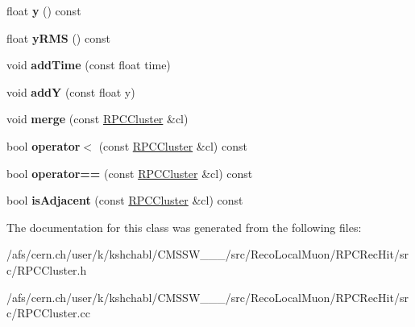 \begin{DoxyCompactItemize}
\item 
\hypertarget{classRPCCluster_a66a7329f93501a605b324adc4971eddd}{float {\bfseries y} () const }\label{classRPCCluster_a66a7329f93501a605b324adc4971eddd}

\item 
\hypertarget{classRPCCluster_aa9cccbb7e3df2edd52bcbae3e6081285}{float {\bfseries y\-R\-M\-S} () const }\label{classRPCCluster_aa9cccbb7e3df2edd52bcbae3e6081285}

\item 
\hypertarget{classRPCCluster_af8a099e1f086a5337d53025dc0677dcf}{void {\bfseries add\-Time} (const float time)}\label{classRPCCluster_af8a099e1f086a5337d53025dc0677dcf}

\item 
\hypertarget{classRPCCluster_ac643a4e1e75c6b569668df42ed7241b8}{void {\bfseries add\-Y} (const float y)}\label{classRPCCluster_ac643a4e1e75c6b569668df42ed7241b8}

\item 
\hypertarget{classRPCCluster_ab8100e804417c8e90871c9da4358e81c}{void {\bfseries merge} (const \hyperlink{classRPCCluster}{R\-P\-C\-Cluster} \&cl)}\label{classRPCCluster_ab8100e804417c8e90871c9da4358e81c}

\item 
\hypertarget{classRPCCluster_ac599fa5d6e93e003869d80fd47cb9771}{bool {\bfseries operator$<$} (const \hyperlink{classRPCCluster}{R\-P\-C\-Cluster} \&cl) const }\label{classRPCCluster_ac599fa5d6e93e003869d80fd47cb9771}

\item 
\hypertarget{classRPCCluster_a04e248c34cdf0c3fc1dc49abe432e171}{bool {\bfseries operator==} (const \hyperlink{classRPCCluster}{R\-P\-C\-Cluster} \&cl) const }\label{classRPCCluster_a04e248c34cdf0c3fc1dc49abe432e171}

\item 
\hypertarget{classRPCCluster_a881be31f414943a589d8185dcc0ea58a}{bool {\bfseries is\-Adjacent} (const \hyperlink{classRPCCluster}{R\-P\-C\-Cluster} \&cl) const }\label{classRPCCluster_a881be31f414943a589d8185dcc0ea58a}

\end{DoxyCompactItemize}


The documentation for this class was generated from the following files\-:\begin{DoxyCompactItemize}
\item 
/afs/cern.\-ch/user/k/kshchabl/\-C\-M\-S\-S\-W\-\_\-\_\-\_/src/\-Reco\-Local\-Muon/\-R\-P\-C\-Rec\-Hit/src/R\-P\-C\-Cluster.\-h\item 
/afs/cern.\-ch/user/k/kshchabl/\-C\-M\-S\-S\-W\-\_\-\_\-\_/src/\-Reco\-Local\-Muon/\-R\-P\-C\-Rec\-Hit/src/R\-P\-C\-Cluster.\-cc\end{DoxyCompactItemize}
